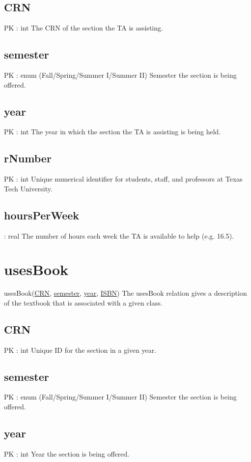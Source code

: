 	\subsection{CRN}
		PK : int 
		The CRN of the section the TA is assisting.
	
	\subsection{semester}
		PK : enum (Fall/Spring/Summer I/Summer II)
		Semester the section is being offered.
			
	\subsection{year}
		PK : int 
		The year in which the section the TA is assisting is being held.
	
	\subsection{rNumber}
		PK : int 
		Unique numerical identifier for students, staff, and professors at Texas Tech University.
	
	\subsection{hoursPerWeek}
		: real 
		The number of hours each week the TA is available to help (e.g. 16.5).


\section{usesBook}
	usesBook(\underline{CRN}, \underline{semester}, \underline{year}, \underline{ISBN}) 
		The usesBook relation gives a description of the textbook that is associated with a given class.
	
	\subsection{CRN}
 		PK : int 
 		Unique ID for the section in a given year.
	
	\subsection{semester}
		PK : enum (Fall/Spring/Summer I/Summer II)
		Semester the section is being offered.
		
	\subsection{year}
		PK : int 
		Year the section is being offered.
	

